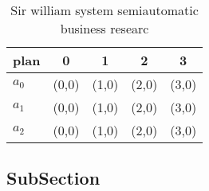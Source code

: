 \documentclass[a4paper]{article}
\begin{document}
\begin{table}
\begin{adjustbox}{width=0.6\columnwidth}
\begin{tabular}{|l|l|l|l|l|}
\hline
\textbf{plan} & \multicolumn{1}{c|}{\textbf{0}} & \multicolumn{1}{c|}{\textbf{1}} & \multicolumn{1}{c|}{\textbf{2}} & \multicolumn{1}{c|}{\textbf{3}} \\ \hline
\textbf{$a_0$}  & (0,0) & (1,0) & (2,0) & (3,0) \\ \hline
\textbf{$a_1$}  & (0,0) & (1,0) & (2,0) & (3,0) \\ \hline
\textbf{$a_2$}  & (0,0) & (1,0) & (2,0) & (3,0) \\ \hline
\end{tabular}
\end{adjustbox}
\caption{Sir william system semiautomatic business researc
}
\end{table}

\subsection{SubSection}
\end{document}
